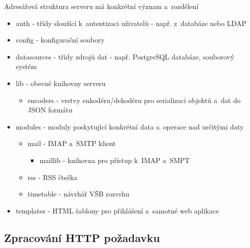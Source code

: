 \documentclass[bc,male,html,dept460]{diploma}				%
\begin{document}
Adresářová struktura serveru má konkrétní význam a~rozdělení
\begin{itemize}
\item auth - třídy sloužící k~autentizaci uživatelů - např. z~databáze nebo LDAP
\item config - konfigurační soubory
\item datasources - třídy zdrojů dat - např. PostgreSQL databáze, souborový systém
\item lib - obecné knihovny serveru
  \begin{itemize}
    \item encoders - vrstvy enkodéru/dekodéru pro serializaci objektů a~dat do JSON formátu
  \end{itemize}
\item modules - moduly poskytující konkrétní data a~operace nad určitými daty
 \begin{itemize}
    \item mail - IMAP a~SMTP klient
	\begin{itemize}
	    \item maillib - knihovna pro přístup k~IMAP a~SMPT
	\end{itemize}
    \item rss - RSS čtečka
    \item timetable - návrhář VŠB rozvrhu
  \end{itemize}
\item templates - HTML šablony pro přihlášení a~samotné web aplikace
\end{itemize}


\subsection{Zpracování HTTP požadavku}
% 
% 
% 
% 
\end{document}

